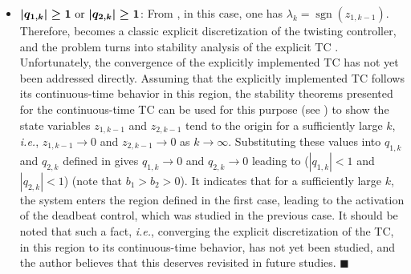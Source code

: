 \documentclass[preprint,12pt]{elsarticle}
\DeclareMathOperator{\sgnsingle}{sgn}
\begin{document}
\begin{itemize}
  \item $\boldsymbol{|q_{1,k}|\geq 1$ or $|q_{2,k}|\geq 1}$:   From , in this case, one has $\lambda_k=\sgnsingle(z_{1,k-1})$. Therefore,   becomes a classic explicit discretization of the twisting controller, and the problem turns into stability analysis of the explicit TC . Unfortunately, the convergence of the explicitly implemented TC  has not yet been addressed directly. Assuming that the explicitly implemented TC  follows its continuous-time  behavior in this region, the stability theorems presented for the continuous-time TC can be used for this purpose (see \cite{Santiesteban_twisting,POLYAKOV_twisting,Orlov_twisting,UTKIN_twisting_stablity,Oza_twisting}) to show the state variables $z_{1,k-1}$ and $z_{2,k-1}$ tend to the origin for a sufficiently large $k$, {\em i.e.}, $z_{1,k-1} \rightarrow 0$ and $z_{2,k-1} \rightarrow 0$ as $k \rightarrow \infty$. Substituting these values into $q_{1,k}$ and $q_{2,k}$
 defined in  gives $q_{1,k} \rightarrow 0$ and $q_{2,k} \rightarrow 0$ leading to ($|q_{1,k}|< 1$ and $|q_{2,k}|<1$) (note that $b_1>b_2>0$).
It indicates that for a sufficiently large $k$, the system enters the region defined in the first case, leading to the activation of the deadbeat control, which was studied in the previous case. It should be noted that such a fact, {\em i.e.}, converging the explicit discretization of the TC, in this region to its continuous-time behavior, has not yet been studied, and the author believes that this deserves revisited in future studies. 
    $\blacksquare$
\end{itemize}










\end{document}
